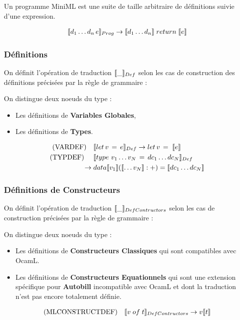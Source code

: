 \documentclass[12pt]{article}
\begin{document}
Un programme MiniML est une suite de taille arbitraire de définitions suivie d'une expression.

\begin{align*}
      \llbracket d_1 \dots d_n \, e \rrbracket_{Prog} \rightarrow \llbracket d_1 \dots d_n \rrbracket\; return \; \llbracket e \rrbracket
\end{align*}

\subsubsection*{Définitions}\label{def}

On définit l'opération de traduction \(\llbracket \_ \rrbracket_{Def}\) selon les cas de construction
des définitions précisées par la règle de grammaire : 

On distingue deux noeuds du type :
\begin{itemize}
      \tightlist
      \item
            Les définitions de \textbf{Variables Globales},
      \item
            Les définitions de \textbf{Types}.
\end{itemize}
\begin{align*}
      \text{(VARDEF)}  \quad & \llbracket let \, v \, = \, e \rrbracket_{Def} \rightarrow   let \, v \, = \; \llbracket e \rrbracket       \\
      \text{(TYPDEF) } \quad & \llbracket type \, \, v_1 \dots v_N \, = \, dc_1 \dots  dc_N \rrbracket_{Def}                           \\
      \rightarrow \;         & data \llbracket v_1 \rrbracket (\llbracket \dots v_N \rrbracket : +) = \llbracket dc_1 \dots dc_N \rrbracket \\
\end{align*}
\subsubsection*{Définitions de Constructeurs}\label{defConstruct} \hfill \break

On définit l'opération de traduction \(\llbracket \_ \rrbracket_{DefContructors}\) selon les cas de construction précisées par la règle de grammaire : 

On distingue deux noeuds du type :
\begin{itemize}
      \tightlist
      \item
            Les définitions de \textbf{Constructeurs Classiques} qui sont compatibles avec OcamL.
      \item
            Les définitions de \textbf{Constructeurs Equationnels} qui sont une extension spécifique pour \textbf{Autobill} incompatible avec OcamL et dont la traduction n'est pas encore totalement définie.
\end{itemize}
\begin{align*}
      \text{(MLCONSTRUCTDEF)} \quad & \llbracket v \; of \; t \rrbracket_{DefContructors}   \rightarrow   v\llbracket t \rrbracket \\
\end{align*}
\end{document}
